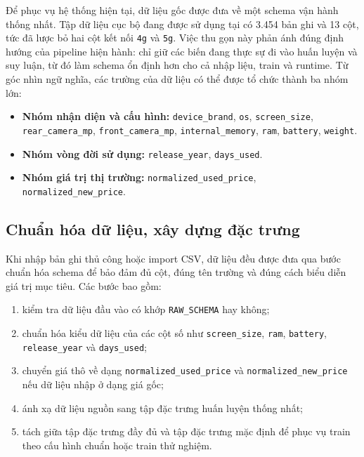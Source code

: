 Để phục vụ hệ thống hiện tại, dữ liệu gốc được đưa về một schema vận hành thống nhất. Tập dữ liệu cục bộ đang được sử dụng tại  có 3.454 bản ghi và 13 cột, tức đã lược bỏ hai cột kết nối \texttt{4g} và \texttt{5g}. Việc thu gọn này phản ánh đúng định hướng của pipeline hiện hành: chỉ giữ các biến đang thực sự đi vào huấn luyện và suy luận, từ đó làm schema ổn định hơn cho cả nhập liệu, train và runtime.
Từ góc nhìn ngữ nghĩa, các trường của dữ liệu có thể được tổ chức thành ba nhóm lớn:
\begin{itemize}
    \item \textbf{Nhóm nhận diện và cấu hình:} \texttt{device\_brand}, \texttt{os}, \texttt{screen\_size}, \texttt{rear\_camera\_mp}, \texttt{front\_camera\_mp}, \texttt{internal\_memory}, \texttt{ram}, \texttt{battery}, \texttt{weight}.
    \item \textbf{Nhóm vòng đời sử dụng:} \texttt{release\_year}, \texttt{days\_used}.
    \item \textbf{Nhóm giá trị thị trường:} \texttt{normalized\_used\_price}, \texttt{normalized\_new\_price}.
\end{itemize}

\subsection{Chuẩn hóa dữ liệu, xây dựng đặc trưng}

Khi nhập bản ghi thủ công hoặc import CSV, dữ liệu đều được đưa qua bước chuẩn hóa schema để bảo đảm đủ cột, đúng tên trường và đúng cách biểu diễn giá trị mục tiêu. Các bước bao gồm: 
\begin{enumerate}[label=\arabic*.]
    \item kiểm tra dữ liệu đầu vào có khớp \texttt{RAW\_SCHEMA} hay không;
    \item chuẩn hóa kiểu dữ liệu của các cột số như \texttt{screen\_size}, \texttt{ram}, \texttt{battery}, \texttt{release\_year} và \texttt{days\_used};
    \item chuyển giá thô về dạng \texttt{normalized\_used\_price} và \texttt{normalized\_new\_price} nếu dữ liệu nhập ở dạng giá gốc;
    \item ánh xạ dữ liệu nguồn sang tập đặc trưng huấn luyện thống nhất;
    \item tách giữa tập đặc trưng đầy đủ và tập đặc trưng mặc định để phục vụ train theo cấu hình chuẩn hoặc train thử nghiệm.
\end{enumerate}


